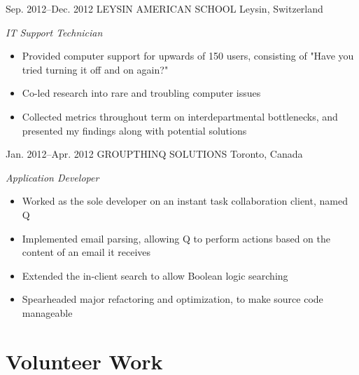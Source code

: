 \documentclass[]{friggeri-cv} %
\begin{document}
\begin{sectionlist}
	\entry
	{Sep. 2012--Dec. 2012}
	{LEYSIN AMERICAN SCHOOL}
	{Leysin, Switzerland}
	{\emph{IT Support Technician} \\
		\begin{itemize}
			\item Provided computer support for upwards of 150 users, consisting of "Have you tried turning it off and on again?" 
			\item Co-led research into rare and troubling computer issues
			\item Collected metrics throughout term on interdepartmental bottlenecks, and presented my findings along with potential solutions 
		\end{itemize}
	}
	
	\entry
	{Jan. 2012--Apr. 2012}
	{GROUPTHINQ SOLUTIONS}
	{Toronto, Canada}
	{\emph{Application Developer} \\
		\begin{itemize}
			\item Worked as the sole developer on an instant task collaboration client, named Q
			\item Implemented email parsing, allowing Q to perform actions based on the content of an email it receives 	
			\item Extended the in-client search to allow Boolean logic searching
			\item Spearheaded major refactoring and optimization, to make source code manageable 
		\end{itemize}
	}
\end{sectionlist}




\section{Volunteer Work}
\end{document}

